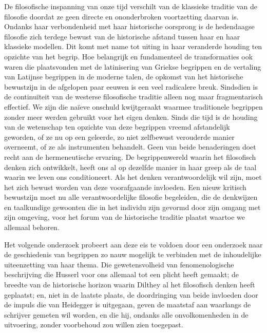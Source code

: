 De filosofische inspanning van onze tijd verschilt van de klassieke traditie van de filosofie doordat ze geen directe en ononderbroken voortzetting daarvan is. Ondanks haar verbondenheid met haar historische oorsprong is de hedendaagse filosofie zich terdege bewust van de historische afstand tussen haar en haar klassieke modellen. Dit komt met name tot uiting in haar veranderde houding ten opzichte van het begrip. Hoe belangrijk en fundamenteel de transformaties ook waren die plaatsvonden met de latinisering van Griekse begrippen en de vertaling van Latijnse begrippen in de moderne talen, de opkomst van het historische bewustzijn in de afgelopen paar eeuwen is een veel radicalere breuk. Sindsdien is de continuïteit van de westerse filosofische traditie alleen nog maar fragmentarisch effectief. We zijn die naïeve onschuld kwijtgeraakt waarmee traditionele begrippen zonder meer werden gebruikt voor het eigen denken. Sinds die tijd is de houding van de wetenschap ten opzichte van deze begrippen vreemd afstandelijk geworden, of ze nu op een geleerde, zo niet zelfbewust verouderde manier overneemt, of ze als instrumenten behandelt. Geen van beide benaderingen doet recht aan de hermeneutische ervaring. De begrippenwereld waarin het filosofisch denken zich ontwikkelt, heeft ons al op dezelfde manier in haar greep als de taal waarin we leven ons conditioneert. Als het denken verantwoordelijk wil zijn, moet het zich bewust worden van deze voorafgaande invloeden. Een nieuw kritisch bewustzijn moet nu alle verantwoordelijke filosofie begeleiden, die de denkwijzen en taalkundige gewoonten die in het individu zijn gevormd door zijn omgang met zijn omgeving, voor het forum van de historische traditie plaatst waartoe we allemaal behoren.

Het volgende onderzoek probeert aan deze eis te voldoen door een onderzoek naar de geschiedenis van begrippen zo nauw mogelijk te verbinden met de inhoudelijke uiteenzetting van haar thema. Die gewetensvolheid van fenomenologische beschrijving die Husserl voor ons allemaal tot een plicht heeft gemaakt; de breedte van de historische horizon waarin Dilthey al het filosofisch denken heeft geplaatst; en, niet in de laatste plaats, de doordringing van beide invloeden door de impuls die van Heidegger is uitgegaan, geven de maatstaf aan waarlangs de schrijver gemeten wil worden, en die hij, ondanks alle onvolkomenheden in de uitvoering, zonder voorbehoud zou willen zien toegepast.
